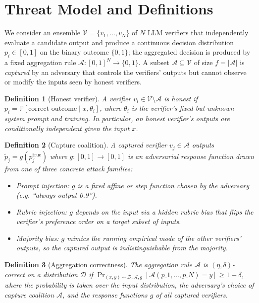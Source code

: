 \documentclass[11pt]{article}
\newtheorem{definition}{Definition}
\newcommand{\V}{\mathcal{V}}            %
\newcommand{\A}{\mathcal{A}}            %
\begin{document}
\section{Threat Model and Definitions}
\label{sec:threat}

We consider an ensemble $\V = \{v_1, \ldots, v_N\}$ of $N$ LLM verifiers
that independently evaluate a candidate output and produce a continuous
decision distribution $p_i \in [0,1]$ on the binary outcome
$\{0,1\}$; the aggregated decision is produced by a fixed aggregation rule
$\mathcal{A}: [0,1]^N \to \{0,1\}$. A subset $\A \subseteq \V$ of size
$f = |\A|$ is \emph{captured} by an adversary that controls the verifiers'
outputs but cannot observe or modify the inputs seen by honest verifiers.

\begin{definition}[Honest verifier]
\label{def:honest}
A verifier $v_i \in \V \setminus \A$ is \emph{honest} if
$p_i = \mathbb{P}[\text{correct outcome} \mid x, \theta_i]$, where $\theta_i$
is the verifier's fixed-but-unknown system prompt and training. In
particular, an honest verifier's outputs are conditionally independent
given the input $x$.
\end{definition}

\begin{definition}[Capture coalition]
\label{def:capture}
A captured verifier $v_j \in \A$ outputs
$\tilde{p}_j = g(p_j^{\text{true}})$ where $g: [0,1] \to [0,1]$ is an
adversarial response function drawn from one of three concrete attack
families:
\begin{itemize}
  \item \emph{Prompt injection}: $g$ is a fixed affine or step function
        chosen by the adversary (e.g. ``always output 0.9'').
  \item \emph{Rubric injection}: $g$ depends on the input via a hidden
        rubric bias that flips the verifier's preference order on a
        target subset of inputs.
  \item \emph{Majority bias}: $g$ mimics the running empirical mode of
        the other verifiers' outputs, so the captured output is
        indistinguishable from the majority.
\end{itemize}
\end{definition}

\begin{definition}[Aggregation correctness]
\label{def:correctness}
The aggregation rule $\mathcal{A}$ is $(\eta, \delta)$-correct on a
distribution $\mathcal{D}$ if
$\Pr_{(x,y) \sim \mathcal{D}, \A, g}
[\mathcal{A}(p\_1, \ldots, p\_N) = y] \geq 1 - \delta$,
where the probability is taken over the input distribution, the
adversary's choice of capture coalition $\A$, and the response
functions $g$ of all captured verifiers.
\end{definition}
\end{document}
